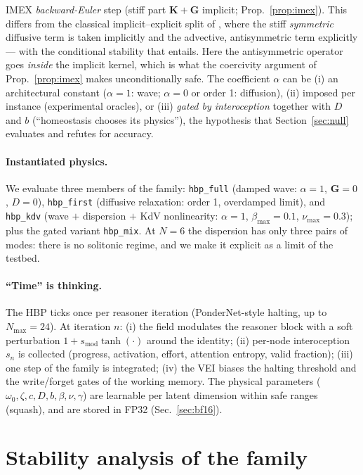 \documentclass{article}
\begin{document}
IMEX \emph{backward-Euler} step (stiff part $\mathbf{K}+\mathbf{G}$ implicit;
Prop.~\ref{prop:imex}). This differs from the classical implicit--explicit
split of \citet{ascher1995imex}, where the stiff \emph{symmetric} diffusive
term is taken implicitly and the advective, antisymmetric term explicitly ---
with the conditional stability that entails. Here the antisymmetric operator
goes \emph{inside} the implicit kernel, which is what the coercivity argument
of Prop.~\ref{prop:imex} makes unconditionally safe.
The coefficient $\alpha$ can be (i) an architectural
constant ($\alpha{=}1$: wave; $\alpha{=}0$ or order 1: diffusion), (ii) imposed
per instance (experimental oracles), or (iii) \emph{gated by interoception}
together with $D$ and $b$ (``homeostasis chooses its physics''), the hypothesis
that Section~\ref{sec:null} evaluates and refutes for accuracy.

\paragraph{Instantiated physics.} We evaluate three members of the family:
\texttt{hbp\_full} (damped wave: $\alpha{=}1$, $\mathbf{G}{=}0$, $D{=}0$),
\texttt{hbp\_first} (diffusive relaxation: order 1, overdamped limit), and
\texttt{hbp\_kdv} (wave $+$ dispersion $+$ KdV nonlinearity: $\alpha{=}1$,
$\beta_{\max}{=}0.1$, $\nu_{\max}{=}0.3$); plus the gated variant
\texttt{hbp\_mix}. At $N{=}6$ the dispersion has only three pairs of modes:
there is no solitonic regime, and we make it explicit as a limit of the
testbed.

\paragraph{``Time'' is thinking.} The HBP ticks once per reasoner iteration
(PonderNet-style halting, up to $N_{\max}{=}24$). At iteration $n$: (i) the
field modulates the reasoner block with a soft perturbation
$1+s_{\mathrm{mod}}\tanh(\cdot)$ around the identity; (ii) per-node interoception
$s_n$ is collected (progress, activation, effort, attention entropy, valid
fraction); (iii) one step of the family is integrated; (iv) the VEI biases the
halting threshold and the write/forget gates of the working memory. The physical
parameters ($\omega_0,\zeta,c,D,b,\beta,\nu,\gamma$) are learnable per latent
dimension within safe ranges (squash), and are stored in FP32
(Sec.~\ref{sec:bf16}).

\section{Stability analysis of the family}
\label{sec:theory}
\end{document}
